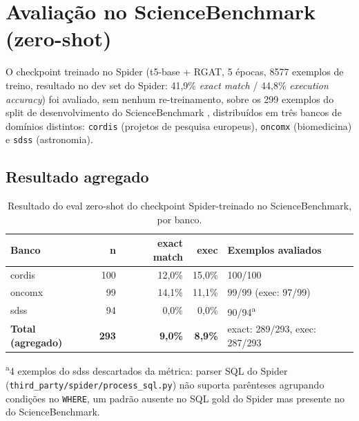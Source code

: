 %

\section{Avaliação no ScienceBenchmark (zero-shot)}
\label{sec:sciencebenchmark-eval}

O checkpoint treinado no Spider (t5-base + RGAT, 5 épocas, 8577 exemplos de
treino, resultado no dev set do Spider: 41,9\% \emph{exact match} / 44,8\%
\emph{execution accuracy}) foi avaliado, sem nenhum re-treinamento, sobre os
299 exemplos do split de desenvolvimento do ScienceBenchmark
\cite{sciencebenchmark2023}, distribuídos em três bancos de domínios distintos:
\texttt{cordis} (projetos de pesquisa europeus), \texttt{oncomx} (biomedicina)
e \texttt{sdss} (astronomia).

\subsection{Resultado agregado}

\begin{table}[h]
\centering
\caption{Resultado do eval zero-shot do checkpoint Spider-treinado no ScienceBenchmark, por banco.}
\label{tab:sciencebenchmark-zeroshot}
\begin{tabular}{lrrrl}
\toprule
\textbf{Banco} & \textbf{n} & \textbf{exact match} & \textbf{exec} & \textbf{Exemplos avaliados} \\
\midrule
cordis            & 100 & 12,0\% & 15,0\% & 100/100 \\
oncomx            & 99  & 14,1\% & 11,1\% & 99/99 (exec: 97/99) \\
sdss              & 94  & 0,0\%  & 0,0\%  & 90/94\textsuperscript{a} \\
\midrule
\textbf{Total (agregado)} & \textbf{293} & \textbf{9,0\%} & \textbf{8,9\%} & exact: 289/293, exec: 287/293 \\
\bottomrule
\end{tabular}

\vspace{0.3em}
{\footnotesize\textsuperscript{a}4 exemplos do sdss descartados da métrica: parser
SQL do Spider (\texttt{third\_party/spider/process\_sql.py}) não suporta
parênteses agrupando condições no \texttt{WHERE}, um padrão ausente no SQL
gold do Spider mas presente no do ScienceBenchmark.}
\end{table}


